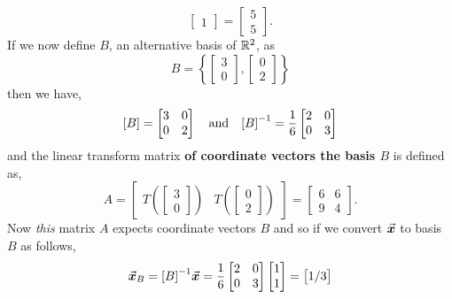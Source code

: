 \documentclass[../MathsNotesBase.tex]{subfiles}
\begin{document}
{\begin{exe}
{\[\begin{bmatrix}
				   1
				   \end{bmatrix} =
				   \begin{bmatrix}
				   5\\
				   5
				   \end{bmatrix}.
				\]
				If we now define $B$, an alternative basis of $\mathbb{R}^{2}$, as
				\[ B = \left\{
							\begin{bmatrix}3\\0\end{bmatrix},
							\begin{bmatrix}0\\2\end{bmatrix}
					   \right\}
				\]
				then we have,
				\[
					[B] = 	\begin{bmatrix}
							3 & 0\\
							0 & 2
							\end{bmatrix}
					\hspace{10pt}\text{and}\hspace{10pt}
					{[B]}^{-1} = \frac{1}{6}
								\begin{bmatrix}
								2 & 0\\
								0 & 3
								\end{bmatrix}
				 \]
				and the linear transform matrix \textbf{of coordinate vectors \wrt the basis $B$} is defined as,
				\[ A = \begin{bmatrix}
						T\left(\begin{bmatrix}3 \\ 0\end{bmatrix}\right) & T\left(\begin{bmatrix}0 \\ 2\end{bmatrix}\right)
						\end{bmatrix} =
						\begin{bmatrix}
						6 & 6\\
						9 & 4
						\end{bmatrix}.
				\]
				Now \textit{this} matrix $A$ expects coordinate vectors \wrt $B$ and so if we convert $\vec{\bm{x}}$ to basis $B$ as follows,
				\[ \vec{\bm{x}}_B = {[B]}^{-1}\vec{\bm{x}} = \frac{1}{6}\begin{bmatrix}
													2 & 0\\
													0 & 3
													\end{bmatrix} 
													\begin{bmatrix}
													1\\
													1
													\end{bmatrix} =
													\begin{bmatrix}
													1/3\\

\end{bmatrix}\]}
\end{exe}}
\end{document}
